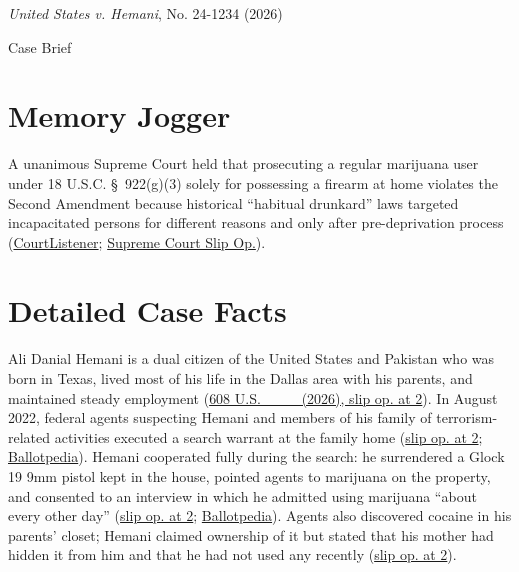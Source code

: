 \documentclass[12pt]{article}
\begin{document}
\begin{center}
{\LARGE \textit{United States v. Hemani}, No. 24-1234 (2026)\par}
\vspace{0.8em}
{\large Case Brief\par}
\end{center}
\vspace{1em}

\section{Memory Jogger}

A unanimous Supreme Court held that prosecuting a regular marijuana user under 18 U.S.C. \S~922(g)(3) solely for possessing a firearm at home violates the Second Amendment because historical ``habitual drunkard'' laws targeted incapacitated persons for different reasons and only after pre-deprivation process (\href{https://www.courtlistener.com/opinion/10876933/united-states-v-hemani/}{CourtListener}; \href{https://www.supremecourt.gov/opinions/25pdf/24-1234_g2bh.pdf}{Supreme Court Slip Op.}).

\section{Detailed Case Facts}

Ali Danial Hemani is a dual citizen of the United States and Pakistan who was born in Texas, lived most of his life in the Dallas area with his parents, and maintained steady employment (\href{https://supreme.justia.com/cases/federal/us/608/24-1234/}{608 U.S. \_\_\_ (2026), slip op. at 2}). In August 2022, federal agents suspecting Hemani and members of his family of terrorism-related activities executed a search warrant at the family home (\href{https://supreme.justia.com/cases/federal/us/608/24-1234/}{slip op. at 2}; \href{https://ballotpedia.org/United_States_v._Hemani}{Ballotpedia}). Hemani cooperated fully during the search: he surrendered a Glock 19 9mm pistol kept in the house, pointed agents to marijuana on the property, and consented to an interview in which he admitted using marijuana ``about every other day'' (\href{https://supreme.justia.com/cases/federal/us/608/24-1234/}{slip op. at 2}; \href{https://ballotpedia.org/United_States_v._Hemani}{Ballotpedia}). Agents also discovered cocaine in his parents' closet; Hemani claimed ownership of it but stated that his mother had hidden it from him and that he had not used any recently (\href{https://supreme.justia.com/cases/federal/us/608/24-1234/}{slip op. at 2}).
\end{document}
